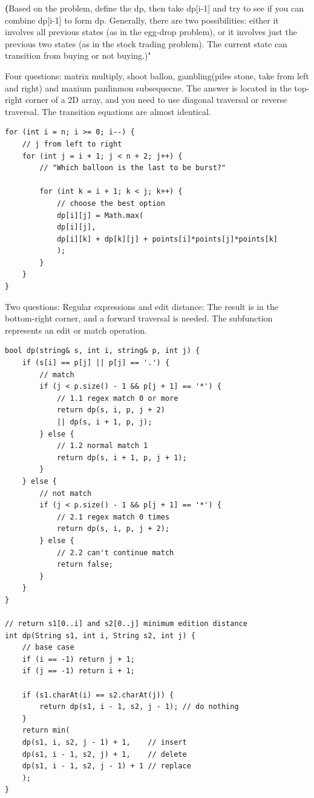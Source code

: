 \documentclass[a4paper,11pt,twoside]{book}
\begin{document}
	\par \textbf(Based on the problem, define the dp, then take dp[i-1] and try to see if you can combine dp[i-1] to form dp. Generally, there are two possibilities: either it involves all previous states (as in the egg-drop problem), or it involves just the previous two states (as in the stock trading problem). The current state can transition from buying or not buying.)"
	
	
	\par Four questions: matrix multiply, shoot ballon, gambling(piles stone, take from left and right) and maxium panlinmon subsequecne. The answer is located in the top-right corner of a 2D array, and you need to use diagonal traversal or reverse traversal. The transition equations are almost identical.
	
\begin{lstlisting}
for (int i = n; i >= 0; i--) {
	// j from left to right
	for (int j = i + 1; j < n + 2; j++) {
		// "Which balloon is the last to be burst?"
		
		for (int k = i + 1; k < j; k++) {
			// choose the best option
			dp[i][j] = Math.max(
			dp[i][j], 
			dp[i][k] + dp[k][j] + points[i]*points[j]*points[k]
			);
		}
	}
}	
\end{lstlisting}	
	
	\par Two questions: Regular expressions and edit distance: The result is in the bottom-right corner, and a forward traversal is needed. The subfunction represents an edit or match operation.
\begin{lstlisting}
bool dp(string& s, int i, string& p, int j) {
	if (s[i] == p[j] || p[j] == '.') {
		// match
		if (j < p.size() - 1 && p[j + 1] == '*') {
			// 1.1 regex match 0 or more
			return dp(s, i, p, j + 2)
			|| dp(s, i + 1, p, j);
		} else {
			// 1.2 normal match 1 
			return dp(s, i + 1, p, j + 1);
		}
	} else {
		// not match 
		if (j < p.size() - 1 && p[j + 1] == '*') {
			// 2.1 regex match 0 times
			return dp(s, i, p, j + 2);
		} else {
			// 2.2 can't continue match
			return false;
		}
	}
}

// return s1[0..i] and s2[0..j] minimum edition distance
int dp(String s1, int i, String s2, int j) {
	// base case
	if (i == -1) return j + 1;
	if (j == -1) return i + 1;
	
	if (s1.charAt(i) == s2.charAt(j)) {
		return dp(s1, i - 1, s2, j - 1); // do nothing
	}
	return min(
	dp(s1, i, s2, j - 1) + 1,    // insert
	dp(s1, i - 1, s2, j) + 1,    // delete
	dp(s1, i - 1, s2, j - 1) + 1 // replace
	);
}		
\end{lstlisting}	
	
\end{document}
